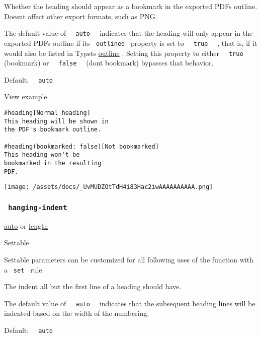 Whether the heading should appear as a bookmark in the exported
PDF\textquotesingle s outline. Doesn\textquotesingle t affect other
export formats, such as PNG.

The default value of \texttt{\ }{\texttt{\ auto\ }}\texttt{\ } indicates
that the heading will only appear in the exported PDF\textquotesingle s
outline if its \texttt{\ outlined\ } property is set to
\texttt{\ }{\texttt{\ true\ }}\texttt{\ } , that is, if it would also be
listed in Typst\textquotesingle s
\href{/docs/reference/model/outline/}{outline} . Setting this property
to either \texttt{\ }{\texttt{\ true\ }}\texttt{\ } (bookmark) or
\texttt{\ }{\texttt{\ false\ }}\texttt{\ } (don\textquotesingle t
bookmark) bypasses that behavior.

Default: \texttt{\ }{\texttt{\ auto\ }}\texttt{\ }


View example

\begin{verbatim}
#heading[Normal heading]
This heading will be shown in
the PDF's bookmark outline.

#heading(bookmarked: false)[Not bookmarked]
This heading won't be
bookmarked in the resulting
PDF.
\end{verbatim}

\texttt{[image: /assets/docs/\_UvMUDZOtTdH4i83Hac2iwAAAAAAAAAA.png]}

\subsubsection{\texorpdfstring{\texttt{\ hanging-indent\ }}{ hanging-indent }}\label{parameters-hanging-indent}

\href{/docs/reference/foundations/auto/}{auto} {or}
\href{/docs/reference/layout/length/}{length}

{{ Settable }}

\label{parameters-hanging-indent-settable-tooltip}
Settable parameters can be customized for all following uses of the
function with a \texttt{\ set\ } rule.

The indent all but the first line of a heading should have.

The default value of \texttt{\ }{\texttt{\ auto\ }}\texttt{\ } indicates
that the subsequent heading lines will be indented based on the width of
the numbering.

Default: \texttt{\ }{\texttt{\ auto\ }}\texttt{\ }

